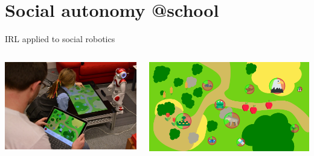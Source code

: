 \documentclass[xcolor=table]{beamer}
\begin{document}
\section*{Social autonomy @school}


{

\begin{frame}{IRL applied to social robotics}

    \begin{columns}
        \begin{column}{0.5\linewidth}

            \includegraphics[width=\linewidth]{sparc/overview}

        \end{column}
        \begin{column}{0.5\linewidth}
            \includegraphics[width=\linewidth]{sparc/gui}
        \end{column}
    \end{columns}


\end{frame}}
\end{document}
